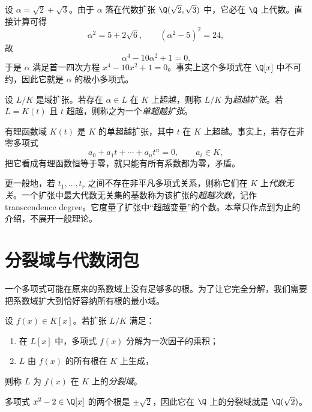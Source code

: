 \begin{example}
设 $\alpha=\sqrt2+\sqrt3$。由于 $\alpha$ 落在代数扩张 $\Q(\sqrt2,\sqrt3)$ 中，它必在 $\Q$ 上代数。直接计算可得
\[
\alpha^2=5+2\sqrt6,
\qquad (\alpha^2-5)^2=24,
\]
故
\[
\alpha^4-10\alpha^2+1=0.
\]
于是 $\alpha$ 满足首一四次方程 $x^4-10x^2+1=0$。事实上这个多项式在 $\Q[x]$ 中不可约，因此它就是 $\alpha$ 的极小多项式。
\end{example}

\begin{definition}
设 $L/K$ 是域扩张。若存在 $\alpha\in L$ 在 $K$ 上超越，则称 $L/K$ 为\emph{超越扩张}。若 $L=K(t)$ 且 $t$ 超越，则称之为一个\emph{单超越扩张}。
\end{definition}

\begin{example}
有理函数域 $K(t)$ 是 $K$ 的单超越扩张，其中 $t$ 在 $K$ 上超越。事实上，若存在非零多项式
\[
a_0+a_1 t+\cdots+a_n t^n=0,\qquad a_i\in K,
\]
把它看成有理函数恒等于零，就只能有所有系数都为零，矛盾。
\end{example}

\begin{remark}
更一般地，若 $t_1,\dots,t_r$ 之间不存在非平凡多项式关系，则称它们在 $K$ 上\emph{代数无关}。一个扩张中最大代数无关集的基数称为该扩张的\emph{超越次数}，记作 transcendence degree。它度量了扩张中“超越变量”的个数。本章只作点到为止的介绍，不展开一般理论。
\end{remark}

\section{分裂域与代数闭包}

一个多项式可能在原来的系数域上没有足够多的根。为了让它完全分解，我们需要把系数域扩大到恰好容纳所有根的最小域。

\begin{definition}
设 $f(x)\in K[x]$。若扩张 $L/K$ 满足：
\begin{enumerate}[label=(\arabic*)]
  \item 在 $L[x]$ 中，多项式 $f(x)$ 分解为一次因子的乘积；
  \item $L$ 由 $f(x)$ 的所有根在 $K$ 上生成，
\end{enumerate}
则称 $L$ 为 $f(x)$ 在 $K$ 上的\emph{分裂域}。
\end{definition}

\begin{example}
多项式 $x^2-2\in\Q[x]$ 的两个根是 $\pm\sqrt2$，因此它在 $\Q$ 上的分裂域就是 $\Q(\sqrt2)$。
\end{example}

